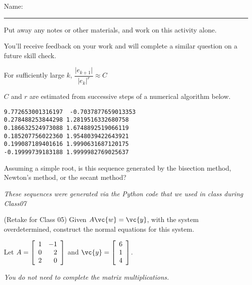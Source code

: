 \documentclass[12pt,letterpaper,noanswers]{exam}
\begin{document}
 \pdfpageheight 11in 
  \pdfpagewidth 8.5in

\noindent Name: \rule{2.5in}{0.5pt}

\noindent Put away any notes or other materials, and work on this activity alone.

\noindent You'll receive feedback on your work and will complete a similar question on a future skill check.


\begin{questions}
\item For sufficiently large $k$, $\dfrac{\vert e_{k+1}\vert}{\vert e_k\vert^r} \approx C$


$C$ and $r$ are estimated from successive steps of a numerical algorithm below.

\begin{verbatim}
9.772653001316197  -0.7037877659013353
0.278488253844298 1.2819516332680758
0.186632524973088 1.6748892519066119
0.185207756022360 1.9548039422643921
0.199087189401616 1.9990631687120175
-0.19999739183188 1.9999982769025637
\end{verbatim}

Assuming a simple root, is this sequence generated by the bisection method, Newton's method, or the secant method?

\emph{These sequences were generated via the Python code that we used in class during Class07}

\vspace{4cm}

\item (Retake for Class 05)
Given $A\vc{w} = \vc{y}$, with the system overdetermined, construct the normal equations for this system.

Let $A = \left[\begin{array}{r r}
1 & -1 \\
0 & 2 \\
2 & 0
\end{array}\right]$ and $\vc{y} =  \left[\begin{array}{r}
6 \\ 1 \\ 4 \end{array}\right]$.  

\emph{You do not need to complete the matrix multiplications.}

\end{questions}
\end{document}
